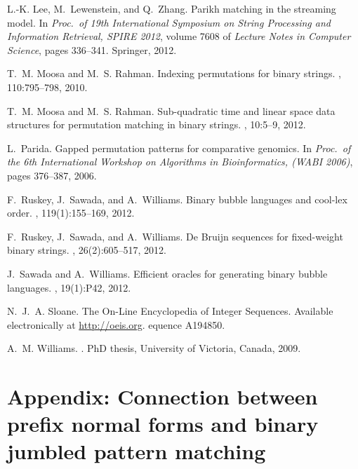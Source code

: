 \documentclass[11pt,a4paper]{llncs}
\begin{document}
\begin{small}
\begin{thebibliography}{10}
L.-K. Lee, M.~Lewenstein, and Q.~Zhang.
\newblock Parikh matching in the streaming model.
\newblock In {\em Proc.\ of 19th International Symposium on String Processing
  and Information Retrieval, SPIRE 2012}, volume 7608 of {\em Lecture Notes in
  Computer Science}, pages 336--341. Springer, 2012.

T.~M. Moosa and M.~S. Rahman.
\newblock Indexing permutations for binary strings.
, 110:795--798, 2010.

T.~M. Moosa and M.~S. Rahman.
\newblock Sub-quadratic time and linear space data structures for permutation
  matching in binary strings.
, 10:5--9, 2012.

L.~Parida.
\newblock Gapped permutation patterns for comparative genomics.
\newblock In {\em Proc.\ of the 6th International Workshop on Algorithms in
  Bioinformatics, (WABI 2006)}, pages 376--387, 2006.

F.~Ruskey, J.~Sawada, and A.~Williams.
\newblock Binary bubble languages and cool-lex order.
, 119(1):155--169, 2012.

F.~Ruskey, J.~Sawada, and A.~Williams.
\newblock De {Bruijn} sequences for fixed-weight binary strings.
, 26(2):605--517, 2012.

J.~Sawada and A.~Williams.
\newblock Efficient oracles for generating binary bubble languages.
, 19(1):P42, 2012.

N.~J.~A. Sloane.
\newblock The {O}n-{L}ine {E}ncyclopedia of {I}nteger {S}equences.
\newblock Available electronically at \url{http://oeis.org}.
equence {A}194850.

A.~M. Williams.
.
\newblock PhD thesis, University of Victoria, Canada, 2009.

\end{thebibliography}
\end{small}






\section*{Appendix: Connection between prefix normal forms and binary jumbled pattern matching}
\end{document}
